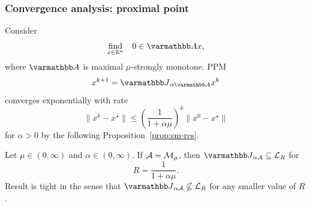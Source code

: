 \documentclass[10pt,mathserif]{beamer}
\begin{document}
\begin{frame}[plain]
\frametitle{Convergence analysis: proximal point}
Consider
\[
\begin{array}{ll}
\underset{x\in \reals^n}{\mbox{find}}&0\in \opA x,
\end{array}
\]
where $\opA$ is maximal $\mu$-strongly monotone.
PPM
\[
x^{k+1}=\opJ_{\alpha \opA}x^k
\]
 converges exponentially with rate 
\[
\|x^k-x^\star\|\le
\left(\frac{1}{1+\alpha\mu}\right)^k
\|x^0-x^\star\|
\]
for $\alpha>0$ by the following Proposition~\ref{prop:sm-res}.
\vspace{0.2in}



\begin{proposition}
\label{prop:sm-res}
Let $\mu\in(0,\infty)$ and $\alpha\in(0,\infty)$.
If ${\mathcal{A}}=\mathcal{M}_\mu$, then 
$\opJ_{\alpha \cA}\subseteq \cL_R$
for
\[
R= \frac{1}{1+\alpha\mu}.
\]
Result is tight in the sense that $\opJ_{\alpha \cA}\nsubseteq \cL_R$ for any smaller value of $R$.
\end{proposition}
\end{frame}
\end{document}
